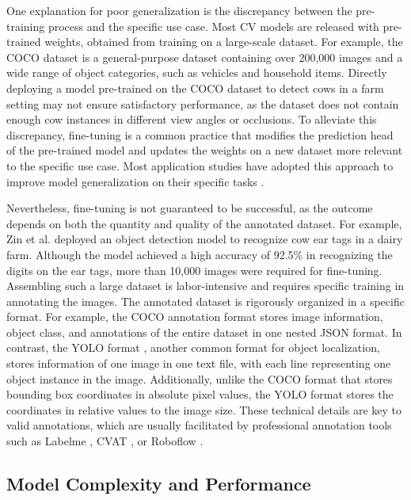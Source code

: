 One explanation for poor generalization is the discrepancy between the pre-training process and the specific use case. Most CV models are released with pre-trained weights, obtained from training on a large-scale dataset. For example, the COCO dataset \cite{lin2014microsoft} is a general-purpose dataset containing over 200,000 images and a wide range of object categories, such as vehicles and household items. Directly deploying a model pre-trained on the COCO dataset to detect cows in a farm setting may not ensure satisfactory performance, as the dataset does not contain enough cow instances in different view angles or occlusions. To alleviate this discrepancy, fine-tuning is a common practice that modifies the prediction head of the pre-trained model and updates the weights on a new dataset more relevant to the specific use case. Most application studies have adopted this approach to improve model generalization on their specific tasks \cite{han2021pre,guirguis2022cfa,gupta2023novel}.

Nevertheless, fine-tuning is not guaranteed to be successful, as the outcome depends on both the quantity and quality of the annotated dataset. For example, Zin et al. \cite{zin_automatic_2020} deployed an object detection model to recognize cow ear tags in a dairy farm. Although the model achieved a high accuracy of 92.5\% in recognizing the digits on the ear tags, more than 10,000 images were required for fine-tuning. Assembling such a large dataset is labor-intensive and requires specific training in annotating the images. The annotated dataset is rigorously organized in a specific format. For example, the COCO annotation format \cite{lin2014microsoft} stores image information, object class, and annotations of the entire dataset in one nested JSON format. In contrast, the YOLO format \cite{ultralytics2023datasets}, another common format for object localization, stores information of one image in one text file, with each line representing one object instance in the image. Additionally, unlike the COCO format that stores bounding box coordinates in absolute pixel values, the YOLO format stores the coordinates in relative values to the image size. These technical details are key to valid annotations, which are usually facilitated by professional annotation tools such as Labelme \cite{labelme2023}, CVAT \cite{cvat2023}, or Roboflow \cite{roboflow2023}.

\subsection*{Model Complexity and Performance}

